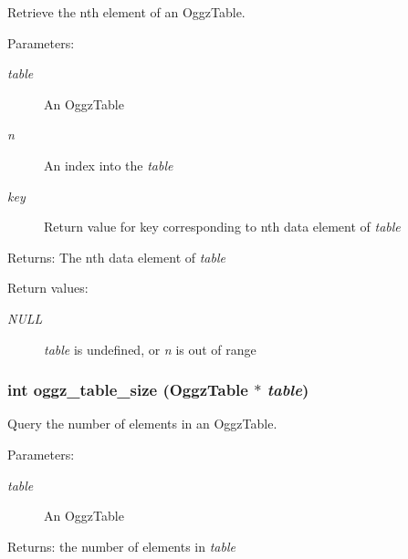 Retrieve the nth element of an Oggz\-Table. 

\begin{Desc}
\item[Parameters:]
\begin{description}
\item[{\em table}]An Oggz\-Table \item[{\em n}]An index into the {\em table\/} \item[{\em key}]Return value for key corresponding to nth data element of {\em table\/} \end{description}
\end{Desc}
\begin{Desc}
\item[Returns:]The nth data element of {\em table\/} \end{Desc}
\begin{Desc}
\item[Return values:]
\begin{description}
\item[{\em NULL}]{\em table\/} is undefined, or {\em n\/} is out of range \end{description}
\end{Desc}
\subsubsection{\setlength{\rightskip}{0pt plus 5cm}int oggz\_\-table\_\-size ({\bf Oggz\-Table} $\ast$ {\em table})}\label{oggz__table_8h_a5}


Query the number of elements in an Oggz\-Table. 

\begin{Desc}
\item[Parameters:]
\begin{description}
\item[{\em table}]An Oggz\-Table \end{description}
\end{Desc}
\begin{Desc}
\item[Returns:]the number of elements in {\em table\/} \end{Desc}
